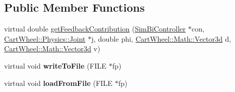 \subsection*{Public Member Functions}
\begin{DoxyCompactItemize}
\item 
virtual double \hyperlink{classCartWheel_1_1Core_1_1DoubleStanceFeedback_a5110582f3dff7c283bbc93bff221b8d2}{getFeedbackContribution} (\hyperlink{classCartWheel_1_1Core_1_1SimBiController}{SimBiController} $\ast$con, \hyperlink{classCartWheel_1_1Physics_1_1Joint}{CartWheel::Physics::Joint} $\ast$j, double phi, \hyperlink{classCartWheel_1_1Math_1_1Vector3d}{CartWheel::Math::Vector3d} d, \hyperlink{classCartWheel_1_1Math_1_1Vector3d}{CartWheel::Math::Vector3d} v)
\item 
\hypertarget{classCartWheel_1_1Core_1_1DoubleStanceFeedback_acbad16b5adf744820b64553f19a6c3d0}{
virtual void {\bfseries writeToFile} (FILE $\ast$fp)}
\label{classCartWheel_1_1Core_1_1DoubleStanceFeedback_acbad16b5adf744820b64553f19a6c3d0}

\item 
\hypertarget{classCartWheel_1_1Core_1_1DoubleStanceFeedback_a3b47c2b988899c177d7c12ef6e324205}{
virtual void {\bfseries loadFromFile} (FILE $\ast$fp)}
\label{classCartWheel_1_1Core_1_1DoubleStanceFeedback_a3b47c2b988899c177d7c12ef6e324205}

\end{DoxyCompactItemize}
